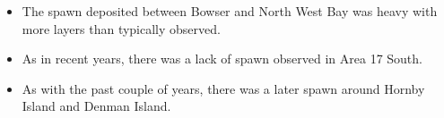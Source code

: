 \begin{itemize}
\item The spawn deposited between Bowser and North West Bay was heavy with more layers than typically observed.
\item As in recent years, there was a lack of spawn observed in Area 17 South.
\item As with the past couple of years, there was a later spawn around Hornby Island and Denman Island.
\end{itemize}